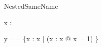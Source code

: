 \begin{zsection}
  \SECTION NestedSameName
\end{zsection}

\begin{axdef}
  x : \power\power\arithmos
\end{axdef}

\begin{axdef}
  y == \{x : x | (\forall x : x @ x = 1) \}
\end{axdef}
